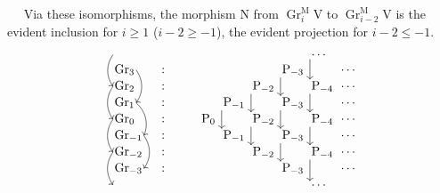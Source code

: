 \documentclass[11pt,leqno]{article}
\newcommand{\Page}[1]{\ifvmode\noindent\else\unskip\ \fi{\footnotesize\textcolor{gray}{[p.\,#1]}}\ \ignorespaces}
\begin{document}
\Page{166}
Via these isomorphisms, the morphism \(\mathrm{N}\) from \(\operatorname{Gr}_i^{\mathrm{M}}\mathrm{V}\) to \(\operatorname{Gr}_{i-2}^{\mathrm{M}}\mathrm{V}\) is the evident inclusion for \(i\ge1\) (\(i-2\ge-1\)), the evident projection for \(i-2\le-1\).
\[
\begin{tikzcd}[
  ampersand replacement=\&,
  row sep=0.2em,
  column sep=0.4em,
  cells={nodes={anchor=west,inner sep=1pt}}
]
\phantom{\operatorname{Gr}_4}
  \arrow[dd,bend right=35,start anchor=west,end anchor=west]
  \&[0.8em] \&[2em] \& \& \& \&
  \cdots\arrow[dd,start anchor=south west,end anchor=north west] \& \\
\operatorname{Gr}_3
  \arrow[dd,bend left=35,start anchor=east,end anchor=east]
  \& \colon \& \& \& \&
  \mathrm{P}_{-3}\arrow[dd,start anchor=south west,end anchor=north west]
  \& \& \cdots \\
\operatorname{Gr}_2
  \arrow[dd,bend right=35,start anchor=west,end anchor=west]
  \& \colon \& \& \&
  \mathrm{P}_{-2}\arrow[dd,start anchor=south west,end anchor=north west]
  \& \&
  \mathrm{P}_{-4}\arrow[dd,start anchor=south west,end anchor=north west]
  \& \cdots \\
\operatorname{Gr}_1
  \arrow[dd,bend left=35,start anchor=east,end anchor=east]
  \& \colon \& \&
  \mathrm{P}_{-1}\arrow[dd,start anchor=south west,end anchor=north west]
  \& \&
  \mathrm{P}_{-3}\arrow[dd,start anchor=south west,end anchor=north west]
  \& \& \cdots \\
\operatorname{Gr}_0
  \arrow[dd,bend right=35,start anchor=west,end anchor=west]
  \& \colon \& \mathrm{P}_0 \& \&
  \mathrm{P}_{-2}\arrow[dd,start anchor=south west,end anchor=north west]
  \& \&
  \mathrm{P}_{-4}\arrow[dd,start anchor=south west,end anchor=north west]
  \& \cdots \\
\operatorname{Gr}_{-1}
  \arrow[dd,bend left=35,start anchor=east,end anchor=east]
  \& \colon \& \& \mathrm{P}_{-1} \& \&
  \mathrm{P}_{-3}\arrow[dd,start anchor=south west,end anchor=north west]
  \& \& \cdots \\
\operatorname{Gr}_{-2}
  \arrow[dd,bend right=35,start anchor=west,end anchor=west]
  \& \colon \& \& \& \mathrm{P}_{-2} \& \&
  \mathrm{P}_{-4}\arrow[dd,start anchor=south west,end anchor=north west]
  \& \cdots \\
\operatorname{Gr}_{-3}
  \& \colon \& \& \& \& \mathrm{P}_{-3} \& \& \cdots \\
\phantom{\operatorname{Gr}_{-4}}
  \& \& \& \& \& \& \cdots \&
\end{tikzcd}
\]
\end{document}
